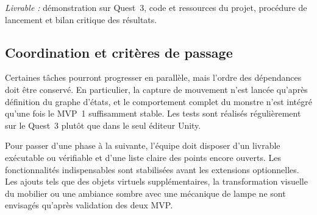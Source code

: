 \documentclass[11pt,a4paper]{article}
\begin{document}
\textit{Livrable :} démonstration sur Quest~3, code et ressources du projet, procédure de lancement et bilan critique des résultats.

\subsection*{Coordination et critères de passage}

Certaines tâches pourront progresser en parallèle, mais l'ordre des dépendances doit être conservé. En particulier, la capture de mouvement n'est lancée qu'après définition du graphe d'états, et le comportement complet du monstre n'est intégré qu'une fois le MVP~1 suffisamment stable. Les tests sont réalisés régulièrement sur le Quest~3 plutôt que dans le seul éditeur Unity.

Pour passer d'une phase à la suivante, l'équipe doit disposer d'un livrable exécutable ou vérifiable et d'une liste claire des points encore ouverts. Les fonctionnalités indispensables sont stabilisées avant les extensions optionnelles. Les ajouts tels que des objets virtuels supplémentaires, la transformation visuelle du mobilier ou une ambiance sombre avec une mécanique de lampe ne sont envisagés qu'après validation des deux MVP.
\end{document}

